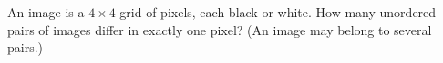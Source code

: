 An image is a $4\times4$ grid of pixels, each black or white. How many unordered pairs of images differ in exactly one pixel? (An image may belong to several pairs.)
